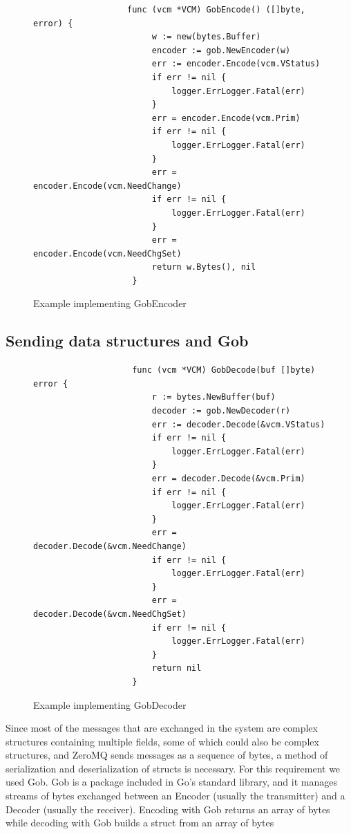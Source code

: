 \documentclass[12pt,a4paper]{report}
\begin{document}
		    \begin{figure}
		        \centering
		         \begin{lstlisting}
                   func (vcm *VCM) GobEncode() ([]byte, error) {
                    	w := new(bytes.Buffer)
                    	encoder := gob.NewEncoder(w)
                    	err := encoder.Encode(vcm.VStatus)
                    	if err != nil {
                    		logger.ErrLogger.Fatal(err)
                    	}
                    	err = encoder.Encode(vcm.Prim)
                    	if err != nil {
                    		logger.ErrLogger.Fatal(err)
                    	}
                    	err = encoder.Encode(vcm.NeedChange)
                    	if err != nil {
                    		logger.ErrLogger.Fatal(err)
                    	}
                    	err = encoder.Encode(vcm.NeedChgSet)
                    	return w.Bytes(), nil
                    }
                 \end{lstlisting}
		        \caption{Example implementing GobEncoder}
		        \label{fig:encoder}
		    \end{figure}
		   \subsection{Sending data structures and Gob}
		   \begin{figure}
		        \centering
		         \begin{lstlisting} 
                    func (vcm *VCM) GobDecode(buf []byte) error {
                    	r := bytes.NewBuffer(buf)
                    	decoder := gob.NewDecoder(r)
                    	err := decoder.Decode(&vcm.VStatus)
                    	if err != nil {
                    		logger.ErrLogger.Fatal(err)
                    	}
                    	err = decoder.Decode(&vcm.Prim)
                    	if err != nil {
                    		logger.ErrLogger.Fatal(err)
                    	}
                    	err = decoder.Decode(&vcm.NeedChange)
                    	if err != nil {
                    		logger.ErrLogger.Fatal(err)
                    	}
                    	err = decoder.Decode(&vcm.NeedChgSet)
                    	if err != nil {
                    		logger.ErrLogger.Fatal(err)
                    	}
                    	return nil
                    }
                 \end{lstlisting}
		        \caption{Example implementing GobDecoder}
		        \label{fig:decoder}
		    \end{figure}
		   Since most of the messages that are exchanged in the system are complex structures containing multiple fields, some of which could also be complex structures, and ZeroMQ sends messages as a sequence of bytes, a method of serialization and deserialization of structs is necessary. For this requirement we used Gob\cite{gob}. Gob is a package included in Go's standard library, and it manages streams of bytes exchanged between an Encoder (usually the transmitter) and a Decoder (usually the receiver). Encoding with Gob returns an array of bytes while decoding with Gob builds a struct from an array of bytes
		   
\end{document}
